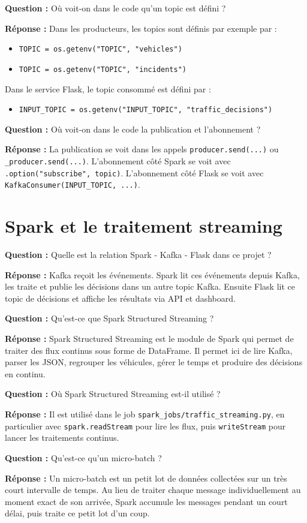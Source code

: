 \documentclass[11pt,a4paper]{article}
\newcommand{\question}[1]{
  \begin{questionbox}
  \textbf{Question :} #1
  \end{questionbox}
}
\newcommand{\reponse}{\textbf{Réponse : }}
\begin{document}
\question{Où voit-on dans le code qu'un topic est défini ?}
\reponse Dans les producteurs, les topics sont définis par exemple par :
\begin{itemize}[leftmargin=1.4em]
  \item \texttt{TOPIC = os.getenv("TOPIC", "vehicles")}
  \item \texttt{TOPIC = os.getenv("TOPIC", "incidents")}
\end{itemize}
Dans le service Flask, le topic consommé est défini par :
\begin{itemize}[leftmargin=1.4em]
  \item \texttt{INPUT\_TOPIC = os.getenv("INPUT\_TOPIC", "traffic\_decisions")}
\end{itemize}

\question{Où voit-on dans le code la publication et l'abonnement ?}
\reponse La publication se voit dans les appels \texttt{producer.send(...)} ou \texttt{\_producer.send(...)}. L'abonnement côté Spark se voit avec \texttt{.option("subscribe", topic)}. L'abonnement côté Flask se voit avec \texttt{KafkaConsumer(INPUT\_TOPIC, ...)}.

\section{Spark et le traitement streaming}

\question{Quelle est la relation Spark - Kafka - Flask dans ce projet ?}
\reponse Kafka reçoit les événements. Spark lit ces événements depuis Kafka, les traite et publie les décisions dans un autre topic Kafka. Ensuite Flask lit ce topic de décisions et affiche les résultats via API et dashboard.

\question{Qu'est-ce que Spark Structured Streaming ?}
\reponse Spark Structured Streaming est le module de Spark qui permet de traiter des flux continus sous forme de DataFrame. Il permet ici de lire Kafka, parser les JSON, regrouper les véhicules, gérer le temps et produire des décisions en continu.

\question{Où Spark Structured Streaming est-il utilisé ?}
\reponse Il est utilisé dans le job \texttt{spark\_jobs/traffic\_streaming.py}, en particulier avec \texttt{spark.readStream} pour lire les flux, puis \texttt{writeStream} pour lancer les traitements continus.

\question{Qu'est-ce qu'un micro-batch ?}
\reponse Un micro-batch est un petit lot de données collectées sur un très court intervalle de temps. Au lieu de traiter chaque message individuellement au moment exact de son arrivée, Spark accumule les messages pendant un court délai, puis traite ce petit lot d'un coup.
\end{document}
